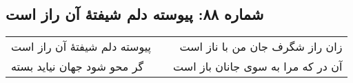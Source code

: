 \begin{center}
\section*{شماره ۸۸: پیوسته دلم شیفتۀ آن راز است}
\label{sec:088}
\begin{longtable}{l p{0.5cm} r}
پیوسته دلم شیفتهٔ آن راز است
&&
زان راز شگرف جان من با ناز است
\\
گر محو شود جهان نیاید بسته
&&
آن در که مرا به سوی جانان باز است
\\
\end{longtable}
\end{center}
